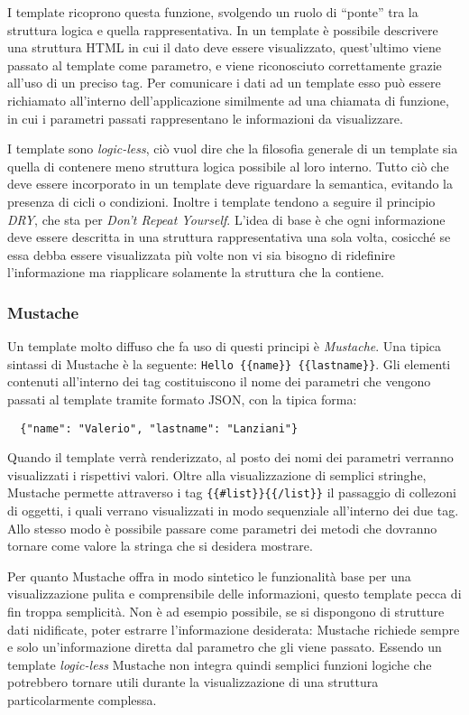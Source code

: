 I template ricoprono questa funzione, svolgendo un ruolo di ``ponte'' tra la struttura logica e quella rappresentativa. In un template è possibile descrivere una struttura HTML in cui il dato deve essere visualizzato, quest'ultimo viene passato al template come parametro, e viene riconosciuto correttamente grazie all'uso di un preciso tag. Per comunicare i dati ad un template esso può essere richiamato all'interno dell'applicazione similmente ad una chiamata di funzione, in cui i parametri passati rappresentano le informazioni da visualizzare.

I template sono {\itshape logic-less}, ciò vuol dire che la filosofia generale di un template sia quella di contenere meno struttura logica possibile al loro interno. Tutto ciò che deve essere incorporato in un template deve riguardare la semantica, evitando la presenza di cicli o condizioni. Inoltre i template tendono a seguire il principio {\itshape DRY}, che sta per {\itshape Don't Repeat Yourself}. L'idea di base è che ogni informazione deve essere descritta in una struttura rappresentativa una sola volta, cosicché se essa debba essere visualizzata più volte non vi sia bisogno di ridefinire l'informazione ma riapplicare solamente la struttura che la contiene.

\subsubsection{Mustache} %
\label{ssub:mustache}
Un template molto diffuso che fa uso di questi principi è {\itshape Mustache}.
Una tipica sintassi di Mustache è la seguente: \lstinline!Hello {{name}} {{lastname}}!. Gli elementi contenuti all'interno dei tag {{}} costituiscono il nome dei parametri che vengono passati al template tramite formato JSON, con la tipica forma:
{\small
\begin{verbatim}
  {"name": "Valerio", "lastname": "Lanziani"}
\end{verbatim}
}
Quando il template verrà renderizzato, al posto dei nomi dei parametri verranno visualizzati i rispettivi valori. Oltre alla visualizzazione di semplici stringhe, Mustache permette attraverso i tag \lstinline!{{#list}}{{/list}}! il passaggio di collezoni di oggetti, i quali verrano visualizzati in modo sequenziale all'interno dei due tag. Allo stesso modo è possibile passare come parametri dei metodi che dovranno tornare come valore la stringa che si desidera mostrare.

Per quanto Mustache offra in modo sintetico le funzionalità base per una visualizzazione pulita e comprensibile delle informazioni, questo template pecca di fin troppa semplicità.
Non è ad esempio possibile, se si dispongono di strutture dati nidificate, poter estrarre l'informazione desiderata: Mustache richiede sempre e solo un'informazione diretta dal parametro che gli viene passato.
Essendo un template {\itshape logic-less} Mustache non integra quindi semplici funzioni logiche che potrebbero tornare utili durante la visualizzazione di una struttura particolarmente complessa.

